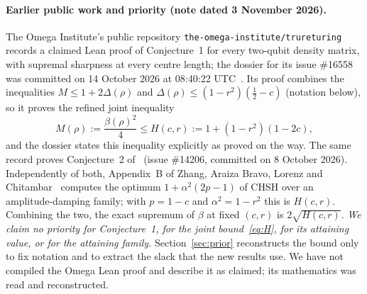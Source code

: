 \documentclass[11pt]{article}
\theoremstyle{remark}\newtheorem{remark}[theorem]{Remark}
\begin{document}
\paragraph{Earlier public work and priority (note dated 3 November 2026).}
The Omega Institute's public repository
\texttt{the-omega-institute/trureturing} records a claimed Lean proof of
Conjecture~1 for every two-qubit density matrix, with supremal sharpness at
every centre length; the dossier for its issue \#16558 was committed on
14 October 2026 at 08:40:22 UTC~\cite{dossier}. Its proof combines the inequalities
$M\le1+2\Delta(\rho)$ and $\Delta(\rho)\le(1-r^2)(\tfrac12-c)$ (notation below),
so it proves the refined joint inequality
\begin{equation}\label{eq:H}
 M(\rho):=\frac{\beta(\rho)^2}{4}\le H(c,r):=1+(1-r^2)(1-2c),
\end{equation}
and the dossier states this inequality explicitly as proved on the way.
The same record proves Conjecture~2 of~\cite{milne} (issue \#14206, committed
on 8 October 2026). Independently of both, Appendix~B of Zhang, Araiza Bravo,
Lorenz and Chitambar~\cite{zhang} computes the optimum $1+\alpha^2(2p-1)$ of
CHSH over an amplitude-damping family; with $p=1-c$ and $\alpha^2=1-r^2$ this
is $H(c,r)$. Combining the two, the exact supremum of $\beta$ at fixed $(c,r)$
is $2\sqrt{H(c,r)}$. \emph{We claim no priority for Conjecture~1, for the
joint bound~\eqref{eq:H}, for its attaining value, or for the attaining family.}
Section~\ref{sec:prior} reconstructs the bound only to fix notation and to
extract the slack that the new results use. We have not compiled the Omega
Lean proof and describe it as claimed; its mathematics was read and
reconstructed.
\end{document}
